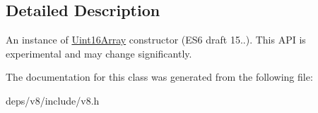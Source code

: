 \subsection{Detailed Description}
An instance of \hyperlink{classv8_1_1_uint16_array}{Uint16\+Array} constructor (E\+S6 draft 15..). This A\+P\+I is experimental and may change significantly. 

The documentation for this class was generated from the following file\+:\begin{DoxyCompactItemize}
\item 
deps/v8/include/v8.\+h\end{DoxyCompactItemize}
